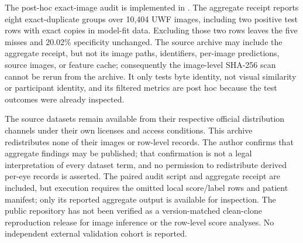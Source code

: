 \documentclass[11pt]{article}
\begin{document}
The post-hoc exact-image audit is implemented in . The aggregate receipt reports eight exact-duplicate groups over 10,404 UWF images, including two positive test rows with exact copies in model-fit data. Excluding those two rows leaves the five misses and 20.02\% specificity unchanged. The source archive may include the aggregate receipt, but not its image paths, identifiers, per-image predictions, source images, or feature cache; consequently the image-level SHA-256 scan cannot be rerun from the archive. It only tests byte identity, not visual similarity or participant identity, and its filtered metrics are post hoc because the test outcomes were already inspected.

The source datasets remain available from their respective official distribution channels under their own licenses and access conditions. This archive redistributes none of their images or row-level records. The author confirms that aggregate findings may be published; that confirmation is not a legal interpretation of every dataset term, and no permission to redistribute derived per-eye records is asserted. The paired audit script and aggregate receipt are included, but execution requires the omitted local score/label rows and patient manifest; only its reported aggregate output is available for inspection. The public repository has not been verified as a version-matched clean-clone reproduction release for image inference or the row-level score analyses. No independent external validation cohort is reported.
\end{document}
